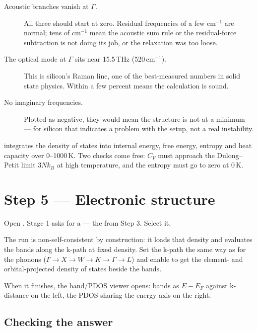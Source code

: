 \begin{description}
  \item[Acoustic branches vanish at $\Gamma$.] All three should start at zero.
    Residual frequencies of a few cm$^{-1}$ are normal; tens of cm$^{-1}$ mean
    the acoustic sum rule or the residual-force subtraction is not doing its
    job, or the relaxation was too loose.
  \item[The optical mode at $\Gamma$ sits near 15.5\,THz (520\,cm$^{-1}$).]
    This is silicon's Raman line, one of the best-measured numbers in solid
    state physics. Within a few percent means the calculation is sound.
  \item[No imaginary frequencies.] Plotted as negative, they would mean the
    structure is not at a minimum --- for silicon that indicates a problem with
    the setup, not a real instability.
\end{description}

\menusep{} integrates the density
of states into internal energy, free energy, entropy and heat capacity over
0--1000\,K. Two checks come free: $C_V$ must approach the Dulong--Petit limit
$3Nk_B$ at high temperature, and the entropy must go to zero at 0\,K.

\section{Step 5 --- Electronic structure}

Open \menusep{}. Stage 1 asks
for a  --- the  from Step 3.
Select it.

The run is non-self-consistent by construction: it loads that density and
evaluates the bands along the k-path at fixed density. Set the k-path the same
way as for the phonons ($\Gamma \to X \to W \to K \to \Gamma \to L$) and enable
 to get the element- and orbital-projected density of states beside
the bands.

When it finishes, the band/PDOS viewer opens: bands as $E - E_F$ against
k-distance on the left, the PDOS sharing the energy axis on the right.

\subsection{Checking the answer}

